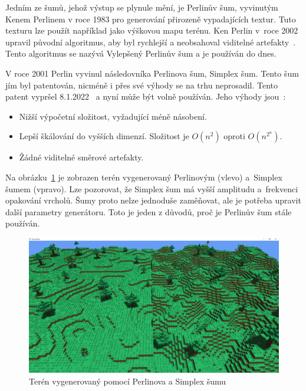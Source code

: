 \documentclass[thesis=M,czech]{FITthesis}[2019/12/23]
\begin{document}
Jedním ze šumů, jehož výstup se plynule mění, je Perlinův šum, vyvinutým Kenem Perlinem v roce 1983 pro generování přirozeně vypadajících textur. Tuto texturu lze použít například jako výškovou mapu terénu. Ken Perlin v~roce 2002 upravil původní algoritmus, aby byl rychlejší a neobsahoval viditelné artefakty~\cite{perlin_noise}. Tento algoritmus se nazývá Vylepšený Perlinův šum a je používán do dnes.

V roce 2001 Perlin vyvinul následovníka Perlinova šum, Simplex šum. Tento šum jím byl patentován, nicméně i přes své výhody se na trhu neprosadil. Tento patent vypršel 8.1.2022~\cite{patent} a nyní může být volně používán. Jeho výhody jsou~\cite{simplex_perlin}:

\begin{itemize}
\item Nižší výpočetní složitost, vyžadující méně násobení.
\item Lepší škálování do vyšších dimenzí. Složitost je $O(n^2)$ oproti $O(n^{2^n})$.
\item Žádné viditelné směrové artefakty.
\end{itemize}

Na obrázku~\ref{fig:perlin_simplex} je zobrazen terén vygenerovaný Perlinovým (vlevo) a~Simplex šumem (vpravo). Lze pozorovat, že Simplex šum má vyšší amplitudu a~frekvenci opakování vrcholů. Šumy proto nelze jednoduše zaměňovat, ale je potřeba upravit další parametry generátoru. Toto je jeden z důvodů, proč je Perlinův šum stále používán.

\begin{figure}\centering
	\includegraphics[width=\textwidth]{images/world_gen/perlin_simplex}
	\caption[Terén vygenerovaný pomocí Perlinova a Simplex šumu]{Terén vygenerovaný pomocí Perlinova a Simplex šumu}\label{fig:perlin_simplex}
\end{figure}
\end{document}
